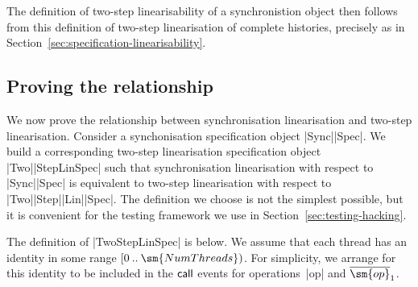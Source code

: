The definition of two-step linearisability of a synchronistion object then
follows from this definition of two-step linearisation of complete histories,
precisely as in Section~\ref{sec:specification-linearisability}.



\subsection{Proving the relationship}
\label{sec:twoStepLinSpec}

We now prove the relationship between synchronisation linearisation and
two-step linearisation.
%
Consider a synchonisation specification object |Sync|\-|Spec|.  We build a
corresponding two-step linearisation specification object |Two|\-|StepLinSpec|
such that synchronisation linearisation with respect to |Sync|\-|Spec| is
equivalent to two-step linearisation with respect to
|Two|\-|Step|\-|Lin|\-|Spec|.  The definition we choose is not the simplest
possible, but it is convenient for the testing framework we use in
Section~\ref{sec:testing-hacking}.

The definition of |TwoStepLinSpec| is below.  We assume that each thread has
an identity in some range $\range 0 {\sm{NumThreads}}$.  For simplicity, we
arrange for this identity to be included in the $\mathsf{call}$ events for
operations~|op| and $\overline{\sm{op}}_1$.



